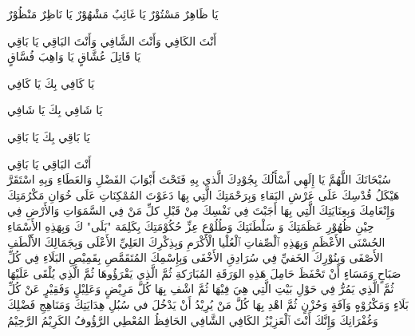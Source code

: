 \documentclass[14pt]{extarticle}
\begin{document}
\begin{hafez}{}{}
\begin{arab}[voc]
يَا ظَاهِرٌ مَسْتُوْرٌ يَا غَائِبٌ مَشْهُوْرٌ يَا نَاظِرٌ مَنْظُوْرٌ

أَنْتَ الكَافِي وَأَنْتَ الشَّافِي وَأَنْتَ البَاقِي يَا بَاقِي \\

يَا قَاتِلَ عُشَّاقٍ يَا وَاهِبَ فُسَّاقٍ

يَا كَافِي بِكَ يَا كَافِي

يَا شَافِي بِكَ يَا شَافِي

يَا بَاقِي بِكَ يَا بَاقِي

أَنْتَ البَاقِي يَا بَاقِي \\

سُبْحَانَكَ اللَّهُمَّ يَا إِلَهِي أَسْأَلُكَ بِجُوْدِكَ الَّذي بِهِ فَتَحْتَ أَبْوَابَ الفَضْلِ وَالعَطَاءِ وَبِهِ اسْتَقَرَّ هَيْكَلُ قُدْسِكَ عَلَى عَرْشِ البَقاءِ وَبِرَحْمَتِكَ الَّتِي بِهَا دَعَوْتَ المُمْكِنَاتِ عَلَى خُوَانِ مَكْرُمَتِكَ وَإِنْعَامِكَ وَبِعِنَايَتِكَ الَّتِي بِهَا أَجَبْتَ فِي نَفْسِكَ مِنْ قَبْلِ كلِّ مَنْ فِي السَّمَوَاتِ وَالأَرْضِ فِي حِيْنِ ظُهُوْرِ عَظَمَتِكَ وَ سَلْطَنَتِكَ وَطُلُوْعِ عِزِّ حُكُوْمَتِكَ بِكَلِمَة "بَلَى" كَ وَبِهَذِهِ الأَسْمَاءِ الحُسْنَى الأَعْظَمِ وَبِهَذِهِ ٱلْصِّفاتِ ٱلْعُلْيا الْأَكْرَمِ وَبِذِكْرِكَ العَلِيِّ الأَعْلَى وَبِجَمَالِكَ الأَلْطَفِ الأَصْفَى وَبِنُوْرِكَ الخَفيِّ فِي سُرَادِقِ الأَخْفَى وَبِإِسْمِكَ المُتَقَمَّصِ بِقَمِيْصِ البَلَاءِ فِي كُلِّ صَبَاحٍ وَمَسَاءٍ أَنْ تَحْفَظَ حَامِلَ هَذِهِ الوَرَقَةِ المُبَارَكةِ ثُمَّ الَّذِي يَقْرَؤُوهَا ثُمَّ الَّذِي يُلْقَى عَلَيْهَا ثُمَّ الَّذِي يَمُرُّ فِي حَوْلِ بَيْتِ الَّتِي هِيَ فِيْهَا ثُمَّ اشْفِ بِهَا كُلَّ مَرِيْضٍ وَعَلِيْلٍ وَفَقِيْرٍ عَنْ كُلِّ بَلَاءٍ وَمَكْرُوْهٍ وَآفَةٍ وَحُزْنٍ ثُمَّ اهْدِ بِهَا كُلَّ مَنْ يُرِيْدُ أَنْ يَدْخُلَ في سُبُلِ هِدَايَتِكَ وَمَنَاهِجِ فَضْلِكَ وَغُفْرَانِكَ وَإِنَّكَ أَنْتَ ٱلْعَزِيْزُ الكَافِي الشَّافِي الحَافِظُ المُعْطِي الرَّؤُوفُ الكَرِيْمُ الرَّحِيْمُ
  \end{arab}
\end{hafez}


\end{document}
